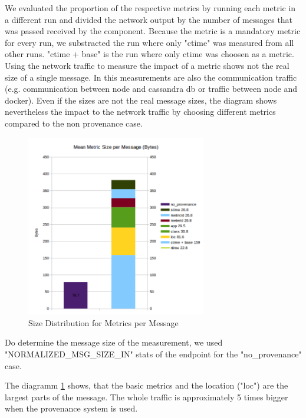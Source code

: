 We evaluated the proportion of the respective metrics by running each metric in a different run and divided the network output by the number of messages that was passed received by the component. Because the metric is a mandatory metric for every run, we substracted the run where only "ctime" was measured from all other runs. "ctime + base" is the run where only ctime was choosen as a metric. Using the network traffic to measure the impact of a metric shows not the real size of a single message. In this measurements are also the communication traffic (e.g. communication between node and cassandra db or traffic between node and docker). Even if the sizes are not the real message sizes, the diagram shows nevertheless the impact to the network traffic by choosing different metrics compared to the non provenance case.

\begin{figure}[H]
	\center
	\includegraphics[width=0.7\textwidth]{figures/overheaddiagram1.png}
	\caption{Size Distribution for Metrics per Message}
	\label{fig:metricsdistribution}
\end{figure}


Do determine the message size of the measurement, we  used  "NORMALIZED\_MSG\_SIZE\_IN" stats of the endpoint for the "no\_provenance" case.

The diagramm \ref{fig:metricsdistribution} shows, that the basic metrics and the location ("loc") are the largest parts of the message. The whole traffic is approximately 5 times bigger when the provenance system is used.


